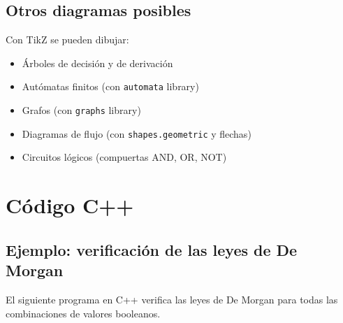 \subsection{Otros diagramas posibles}

Con TikZ se pueden dibujar:
\begin{itemize}
    \item Árboles de decisión y de derivación
    \item Autómatas finitos (con \texttt{automata} library)
    \item Grafos (con \texttt{graphs} library)
    \item Diagramas de flujo (con \texttt{shapes.geometric} y flechas)
    \item Circuitos lógicos (compuertas AND, OR, NOT)
\end{itemize}


\section{Código C++}

\subsection{Ejemplo: verificación de las leyes de De Morgan}

El siguiente programa en C++ verifica las leyes de De Morgan
para todas las combinaciones de valores booleanos.

%
%

